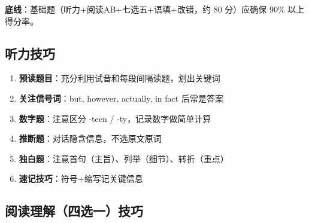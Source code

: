 \textbf{底线}：基础题（听力+阅读AB+七选五+语填+改错，约 80 分）应确保 90\% 以上得分率。

\subsection{听力技巧}

\begin{enumerate}
  \item \textbf{预读题目}：充分利用试音和每段间隔读题，划出关键词
  \item \textbf{关注信号词}：but, however, actually, in fact 后常是答案
  \item \textbf{数字题}：注意区分 -teen / -ty，记录数字做简单计算
  \item \textbf{推断题}：对话隐含信息，不选原文原词
  \item \textbf{独白题}：注意首句（主旨）、列举（细节）、转折（重点）
  \item \textbf{速记技巧}：符号+缩写记关键信息
\end{enumerate}

\subsection{阅读理解（四选一）技巧}

